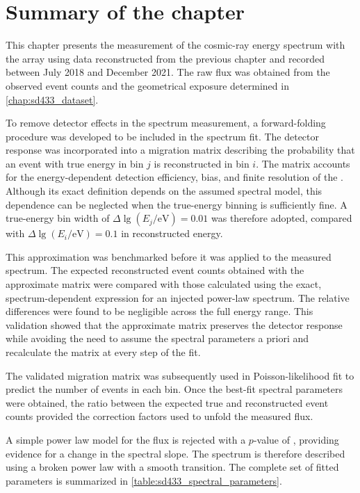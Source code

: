 \documentclass[main.tex]{subfiles}
\begin{document}
\section{Summary of the chapter}

This chapter presents the measurement of the cosmic-ray energy spectrum with the  array using data reconstructed from the previous chapter and recorded between July 2018 and December 2021.
The raw flux was obtained from the observed event counts and the geometrical exposure determined in \cref{chap:sd433_dataset}.

To remove detector effects in the spectrum measurement, a forward-folding procedure was developed to be included in the spectrum fit.
The detector response was incorporated into a migration matrix describing the probability that an event with true energy in bin $j$ is reconstructed in bin $i$.
The matrix accounts for the energy-dependent detection efficiency, bias, and finite resolution of the .
Although its exact definition depends on the assumed spectral model, this dependence can be neglected when the true-energy binning is sufficiently fine.
A true-energy bin width of $\Delta\lg(E_j/\mathrm{eV})=0.01$ was therefore adopted, compared with $\Delta\lg(E_i/\mathrm{eV})=0.1$ in reconstructed energy.

This approximation was benchmarked before it was applied to the measured spectrum.
The expected reconstructed event counts obtained with the approximate matrix were compared with those calculated using the exact, spectrum-dependent expression for an injected power-law spectrum.
The relative differences were found to be negligible across the full energy range.
This validation showed that the approximate matrix preserves the detector response while avoiding the need to assume the spectral parameters a priori and recalculate the matrix at every step of the fit.

The validated migration matrix was subsequently used in Poisson-likelihood fit to predict the number of events in each bin.
Once the best-fit spectral parameters were obtained, the ratio between the expected true and reconstructed event counts provided the correction factors used to unfold the measured flux.

A simple power law model for the flux is rejected with a $p$-value of
\SDFourThreeThreePowerLawPValue, providing evidence for a change in the spectral slope.
The spectrum is therefore described using a broken power law with a smooth transition.
The complete set of fitted parameters is summarized in
\cref{table:sd433_spectral_parameters}.
\end{document}
